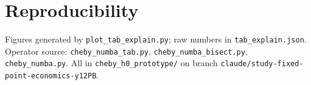 \documentclass[11pt]{article}
\begin{document}
\section*{Reproducibility}

Figures generated by \texttt{plot\_tab\_explain.py}; raw numbers in
\texttt{tab\_explain.json}. Operator source:
\texttt{cheby\_numba\_tab.py}, \texttt{cheby\_numba\_bisect.py},
\texttt{cheby\_numba.py}. All in
\texttt{cheby\_h0\_prototype/} on branch
\texttt{claude/study-fixed-point-economics-y12PB}.
\end{document}
